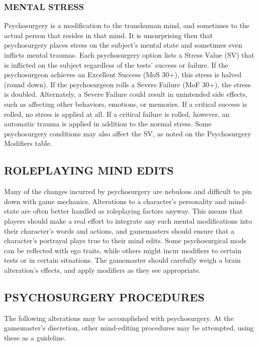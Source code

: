 \subsubsection{MENTAL STRESS} Psychosurgery is a modification to the transhuman mind, and sometimes to the actual person that resides in that mind. It is unsurprising then that psychosurgery places stress on the subject’s mental state and sometimes even inflicts mental traumas. Each psychosurgery option lists a Stress Value (SV) that is inflicted on the subject regardless of the tests’ success or failure. If the psychosurgeon achieves an Excellent Success (MoS 30+), this stress is halved (round down). If the psychosurgeon rolls a Severe Failure (MoF 30+), the stress is doubled. Alternately, a Severe Failure could result in unintended side effects, such as affecting other behaviors, emotions, or memories. If a critical success is rolled, no stress is applied at all. If a critical failure is rolled, however, an automatic trauma is applied in addition to the normal stress. Some psychosurgery conditions may also affect the SV, as noted on the Psychosurgery Modifiers table. 



\subsection{ROLEPLAYING MIND EDITS} Many of the changes incurred by psychosurgery are nebulous and difficult to pin down with game mechanics. Alterations to a character’s personality and mind-state are often better handled as roleplaying factors anyway. This means that players should make a real effort to integrate any such mental modifications into their character’s words and actions, and gamemasters should ensure that a character’s portrayal plays true to their mind edits. Some psychosurgical mods can be reflected with ego traits, while others might incur modifiers to certain tests or in certain situations. The gamemaster should carefully weigh a brain alteration’s effects, and apply modifiers as they see appropriate. 



\subsection{PSYCHOSURGERY PROCEDURES} The following alterations may be accomplished with psychosurgery. At the gamemaster’s discretion, other mind-editing procedures may be attempted, using these as a guideline. 

